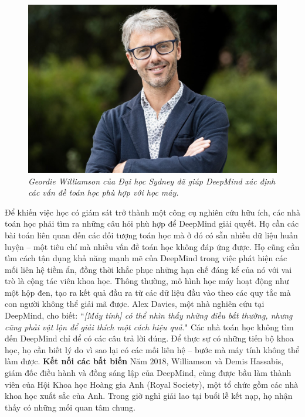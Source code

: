 \begin{multicols}{2}
\begin{figure}[H]
		\captionsetup{labelformat= empty, justification=centering}
		\includegraphics[width=1\linewidth]{2}
		\caption{\small\textit{\color{duongvaotoanhoc}Geordie Williamson của Đại học Sydney đã giúp DeepMind xác định các vấn đề toán học phù hợp với học máy.}}
		\vspace*{-10pt}
	\end{figure}
	Để khiến việc học có giám sát trở thành một công cụ nghiên cứu hữu ích, các nhà toán học phải tìm ra những câu hỏi phù hợp để DeepMind giải quyết. Họ cần các bài toán liên quan đến các đối tượng toán học mà ở đó có sẵn nhiều dữ liệu huấn luyện -- một tiêu chí mà nhiều vấn đề toán học không đáp ứng được.
	\vskip 0.05cm
	Họ cũng cần tìm cách tận dụng khả năng mạnh mẽ của DeepMind trong việc phát hiện các mối liên hệ tiềm ẩn, đồng thời khắc phục những hạn chế đáng kể của nó với vai trò là cộng tác viên khoa học. Thông thường, mô hình học máy hoạt động như một hộp đen, tạo ra kết quả đầu ra từ các dữ liệu đầu vào theo các quy tắc mà con người không thể giải mã được.
	\vskip 0.05cm
	Alex Davies, một nhà nghiên cứu tại DeepMind, cho biết: ``\textit{[Máy tính] có thể nhìn thấy những điều bất thường, nhưng cũng phải vật lộn để giải thích một cách hiệu quả.}"
	\vskip 0.05cm
	Các nhà toán học không tìm đến DeepMind chỉ để có các câu trả lời đúng. Để thực sự có những tiến bộ khoa học, họ cần biết lý do vì sao lại có các mối liên hệ – bước mà máy tính không thể làm được.
	\vskip 0.05cm
	\textbf{\color{duongvaotoanhoc}Kết nối các bất biến}
	\vskip 0.05cm
	Năm $2018$, Williamson và Demis Hassabis, giám đốc điều hành và đồng sáng lập của DeepMind, cùng được bầu làm thành viên của Hội Khoa học Hoàng gia Anh (Royal Society), một tổ chức gồm các nhà khoa học xuất sắc của Anh. Trong  giờ nghỉ giải lao tại buổi lễ kết nạp, họ nhận thấy có những mối quan tâm chung.

\end{multicols}

